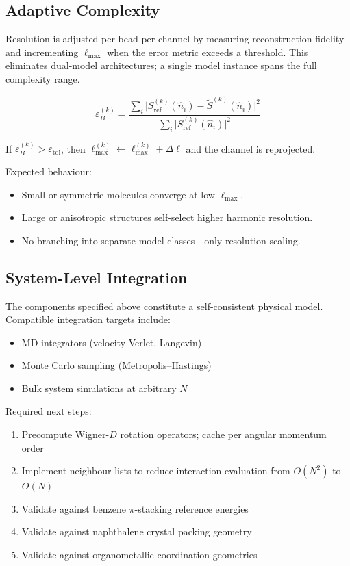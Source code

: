 \documentclass[11pt]{article}
\begin{document}
\subsection{Adaptive Complexity}

Resolution is adjusted per-bead per-channel by measuring reconstruction
fidelity and incrementing $\ell_{\max}$ when the error metric exceeds a
threshold.  This eliminates dual-model architectures; a single model instance
spans the full complexity range.

\begin{equation}
    \varepsilon_B^{(k)} = \frac{\sum_i \bigl| S_{\mathrm{ref}}^{(k)}(\hat{n}_i) - \tilde{S}^{(k)}(\hat{n}_i) \bigr|^2}
                               {\sum_i \bigl| S_{\mathrm{ref}}^{(k)}(\hat{n}_i) \bigr|^2}
\end{equation}

If $\varepsilon_B^{(k)} > \varepsilon_{\mathrm{tol}}$, then $\ell_{\max}^{(k)} \leftarrow \ell_{\max}^{(k)} + \Delta\ell$ and the channel is reprojected.

Expected behaviour:
\begin{itemize}
    \item Small or symmetric molecules converge at low $\ell_{\max}$.
    \item Large or anisotropic structures self-select higher harmonic resolution.
    \item No branching into separate model classes---only resolution scaling.
\end{itemize}

\subsection{System-Level Integration}

The components specified above constitute a self-consistent physical model.
Compatible integration targets include:
\begin{itemize}
    \item MD integrators (velocity Verlet, Langevin)
    \item Monte Carlo sampling (Metropolis--Hastings)
    \item Bulk system simulations at arbitrary $N$
\end{itemize}

Required next steps:
\begin{enumerate}
    \item Precompute Wigner-$D$ rotation operators; cache per angular momentum order
    \item Implement neighbour lists to reduce interaction evaluation from $O(N^2)$ to $O(N)$
    \item Validate against benzene $\pi$-stacking reference energies
    \item Validate against naphthalene crystal packing geometry
    \item Validate against organometallic coordination geometries
\end{enumerate}
\end{document}
